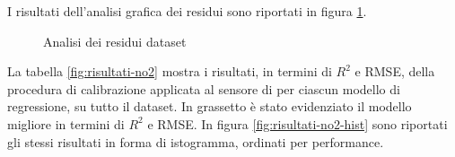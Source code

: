 I risultati dell'analisi grafica dei residui sono riportati in figura \ref{fig:residui_no2}.

\begin{figure}[H]
\centering
{}\hfil
{}

\hfil
{}
\caption{Analisi dei residui dataset }
\label{fig:residui_no2}
\end{figure}

La tabella \ref{fig:risultati-no2} mostra i risultati, in termini di $R^2$ e RMSE, della procedura di calibrazione applicata al sensore di  per ciascun modello di regressione, su tutto il dataset. In grassetto è stato evidenziato il modello migliore in termini di $R^2$ e RMSE.
In figura \ref{fig:risultati-no2-hist} sono riportati gli stessi risultati in forma di istogramma, ordinati per performance.

